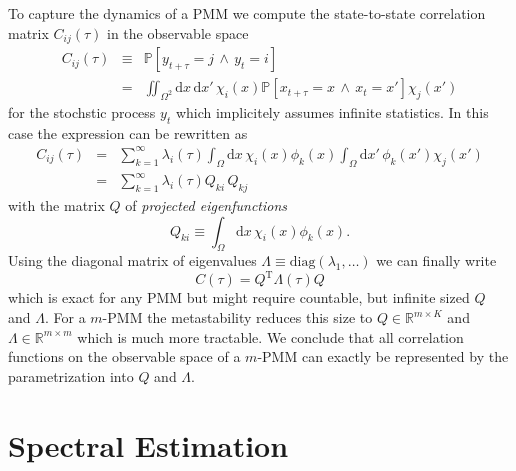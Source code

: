 \documentclass[aps,pre,twocolumn,nofootinbib,superscriptaddress,linenumbers]{revtex4-1}
\begin{document}
To capture the dynamics of a PMM we compute the state-to-state correlation
matrix $C_{ij}(\tau)$ in the observable space 
\begin{eqnarray*}
C_{ij}(\tau) & \equiv & \mathbb{P}\left[y_{t+\tau}=j\,\wedge\, y_{t}=i\right]\\
 & = & \iint_{\Omega^{2}}\text{d}x\,\text{d}x'\,\chi_{i}(x)\mathbb{P}\left[x_{t+\tau}=x\,\wedge\, x_{t}=x'\right]\chi_{j}(x')
\end{eqnarray*}
for the stochstic process $y_{t}$ which implicitely assumes infinite
statistics. In this case the expression can be rewritten as
\begin{eqnarray*}
C_{ij}(\tau) & = & \sum_{k=1}^{\infty}\lambda_{i}(\tau)\int_{\Omega}\text{d}x\,\chi_{i}(x)\phi_{k}(x)\int_{\Omega}\text{d}x'\,\phi_{k}(x')\chi_{j}(x')\\
 & = & \sum_{k=1}^{\infty}\lambda_{i}(\tau)Q_{ki}\, Q_{kj}
\end{eqnarray*}
with the matrix $Q$ of \emph{projected eigenfunctions }
\[
Q_{ki}\equiv\int_{\Omega}\text{d}x\,\chi_{i}(x)\phi_{k}(x).
\]
Using the diagonal matrix of eigenvalues $\Lambda\equiv\text{diag}\left(\lambda_{1},\ldots\right)$
we can finally write
\[
C(\tau)=Q^{\text{T}}\Lambda(\tau)Q
\]
which is exact for any PMM but might require countable, but infinite
sized $Q$ and $\Lambda$. For a $m$-PMM the metastability reduces
this size to $Q\in\mathbb{R}^{m\times K}$ and $\Lambda\in\mathbb{R}^{m\times m}$
which is much more tractable. We conclude that all correlation functions
on the observable space of a $m$-PMM can exactly be represented by
the parametrization into $Q$ and $\Lambda$.


\section{Spectral Estimation}
\label{section:spectralestimation}
\end{document}
